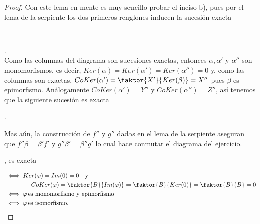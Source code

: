 \documentclass{article}
\begin{document}
\begin{enumerate}[label=\textbf{Ej \arabic*.}]
\begin{proof}
Con este lema en mente es muy sencillo probar el inciso b), pues por el lema de la serpiente los dos primeros renglones inducen la
sucesión exacta \\
\\
.\\
Como las columnas del diagrama son sucesiones exactas, entonces $\alpha, \alpha'$ y $\alpha''$ son monomorfismos, es decir, 
$Ker(\alpha)=Ker(\alpha')=Ker(\alpha'')=0$ y, como las columnas son exactas, $CoKer(\alpha')=\faktor{X'}{Ker(\beta)}=X''$
pues $\beta$ es epimorfismo. Análogamente $CoKer(\alpha')=Y''$ y $CoKer(\alpha'')=Z''$, así tenemos que la siguiente sucesión 
es exacta
\begin{center}
.
\end{center}
Mas aún, la construcción de $f''$ y $g''$ dadas en el lema de la serpiente aseguran que $f''\beta=\beta'f'$ y $g''\beta'=\beta''g'$ lo 
cual hace conmutar el diagrama del ejercicio.\\
\newpage
{} 
\begin{center}
, es exacta
\end{center}
\begin{align*}
			 &\iff Ker(\varphi)=Im(0)=0\text{\quad y}\\
			& \hspace{1.5cm} CoKer(\varphi)=\faktor{B}{Im(\varphi)}=\faktor{B}{Ker(0)}=\faktor{B}{B}=0\\
			&\iff  \varphi \text{\,es monomorfismo y epimorfismo}\\
			&\iff \varphi \text{\,es isomorfismo}.
\end{align*}
\end{proof}



\end{enumerate}
\end{document}
